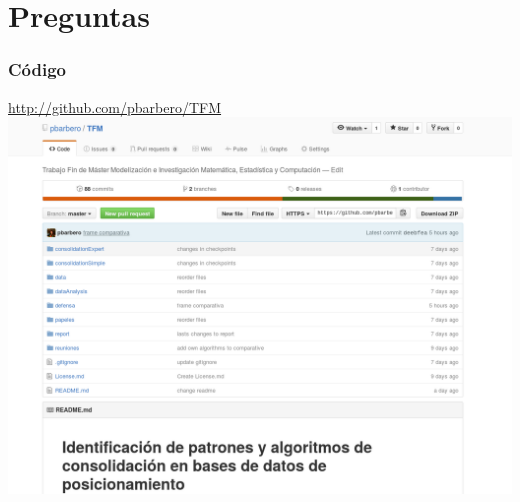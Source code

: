 \documentclass[10pt, spanish]{beamer}
\begin{document}
\section{Preguntas}

\begin{frame}[fragile]
	\frametitle{C\'odigo}
	\begin{center}
		\href{http://github.com/pbarbero/TFM}{http://github.com/pbarbero/TFM}
		\includegraphics[scale=.3]{github.png}
	\end{center}
\end{frame}
\end{document}
